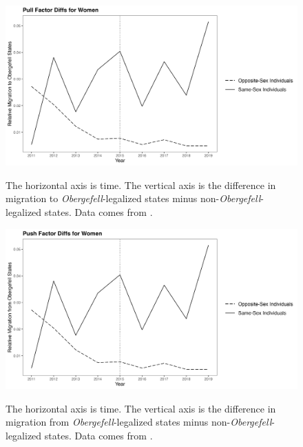 \documentclass[12pt,letterpaper]{article}
\begin{document}
\begin{figure}[htbp]
    \centering
    \caption{}
    \label{fig: women_post_diffs}
    \includegraphics[width=.75\linewidth]{outputs/summary_stats/women_post_diffs.png}

    \vspace{0.5em}
    \begin{minipage}{0.75\linewidth}
        \footnotesize The horizontal axis is time. The vertical axis is the difference in migration to \textit{Obergefell}-legalized states minus non-\textit{Obergefell}-legalized states. Data comes from \citet{28}.
    \end{minipage}
\end{figure}
\begin{figure}[htbp]
    \centering
    \caption{}
    \label{fig: women_ante_diffs}
    \includegraphics[width=.75\linewidth]{outputs/summary_stats/women_ante_diffs.png}

    \vspace{0.5em}
    \begin{minipage}{0.75\linewidth}
        \footnotesize The horizontal axis is time. The vertical axis is the difference in migration from \textit{Obergefell}-legalized states minus non-\textit{Obergefell}-legalized states. Data comes from \citet{28}.
    \end{minipage}
\end{figure}
\end{document}
